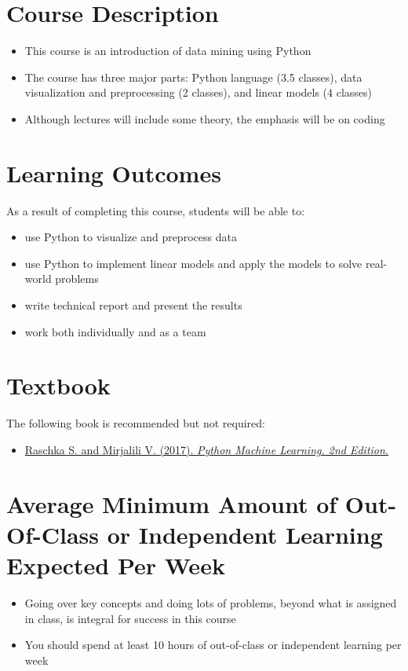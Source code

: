 \documentclass[pdftex,11pt]{artikel3}
\begin{document}
\section{Course Description}
\begin{itemize}
\item This course is an introduction of data mining using Python
\item The course has three major parts: Python language (3.5 classes), data visualization and preprocessing (2 classes), and linear models (4 classes)
\item Although lectures will include some theory, the emphasis will be on coding
\end{itemize}

\section{Learning Outcomes}
As a result of completing this course, students will be able to:
\begin{itemize}
\item use Python to visualize and preprocess data
\item use Python to implement linear models and apply the models to  solve real-world problems
\item write technical report and present the results
\item work both individually and as a team 
\end{itemize}

\section{Textbook}
The following book is recommended but not required:

\begin{itemize}
\item \href{https://sebastianraschka.com/books.html}{Raschka S. and  Mirjalili V. (2017). \textit{Python Machine Learning. 2nd Edition.}}
\end{itemize}

\section{Average Minimum Amount of Out-Of-Class or Independent Learning Expected Per Week}
\begin{itemize}
\item Going over key concepts and doing lots of problems, beyond what is assigned in class, is integral for success in this course
\item You should spend at least 10 hours of out-of-class or independent learning per week 
\end{itemize}
 
\end{document}
